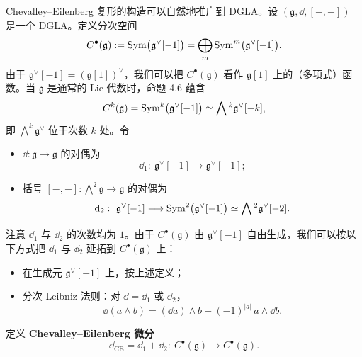 Chevalley--Eilenberg 复形的构造可以自然地推广到 DGLA。设
$(\mathfrak g,\dd,[-,-])$ 是一个 DGLA。定义分次空间
\[
  C^{\bullet}(\mathfrak g):=\operatorname{Sym}\bigl(\mathfrak g^{\vee}[-1]\bigr)
  =\bigoplus_{m}\operatorname{Sym}^{m}\bigl(\mathfrak g^{\vee}[-1]\bigr).
\]
由于 $\mathfrak g^{\vee}[-1]=(\mathfrak g[1])^{\vee}$，我们可以把
$C^{\bullet}(\mathfrak g)$ 看作 $\mathfrak g[1]$ 上的（多项式）函数。当 $\mathfrak g$
是通常的 Lie 代数时，命题 4.6 蕴含
\[
  C^{k}(\mathfrak g)=\operatorname{Sym}^{k}\bigl(\mathfrak g^{\vee}[-1]\bigr)
  \simeq\bigwedge{}^{k}\mathfrak g^{\vee}[-k],
\]
即 $\bigwedge^{k}\mathfrak g^{\vee}$ 位于次数 $k$ 处。令
\begin{itemize}[leftmargin=1.6em,itemsep=0.3em]
  \item $\dd:\mathfrak g\to\mathfrak g$ 的对偶为
        \[
          \dd_1:\ \mathfrak g^{\vee}[-1]\longrightarrow\mathfrak g^{\vee}[-1];
        \]
  \item 括号 $[-,-]:\bigwedge^{2}\mathfrak g\to\mathfrak g$ 的对偶为
        \[
          \mathrm{d}_2:\ \mathfrak g^{\vee}[-1]\longrightarrow
          \operatorname{Sym}^{2}\bigl(\mathfrak g^{\vee}[-1]\bigr)
          \simeq\bigwedge{}^{2}\mathfrak g^{\vee}[-2].
        \]
\end{itemize}
注意 $\dd_1$ 与 $\dd_2$ 的次数均为 $1$。由于 $C^{\bullet}(\mathfrak g)$ 由
$\mathfrak g^{\vee}[-1]$ 自由生成，我们可以按以下方式把 $\dd_1$ 与 $\dd_2$ 延拓到
$C^{\bullet}(\mathfrak g)$ 上：
\begin{itemize}[leftmargin=1.6em,itemsep=0.3em]
  \item 在生成元 $\mathfrak g^{\vee}[-1]$ 上，按上述定义；
  \item 分次 Leibniz 法则：对 $\dd=\dd_1$ 或 $\dd_2$，
        \[
          \dd(a\wedge b)=(\dd a)\wedge b+(-1)^{|a|}\,a\wedge \dd b.
        \]
\end{itemize}
定义 \textbf{Chevalley--Eilenberg 微分}
\[
  \dd_{\mathrm{CE}}=\dd_1+\dd_2:\ C^{\bullet}(\mathfrak g)\longrightarrow
  C^{\bullet}(\mathfrak g).
\]


